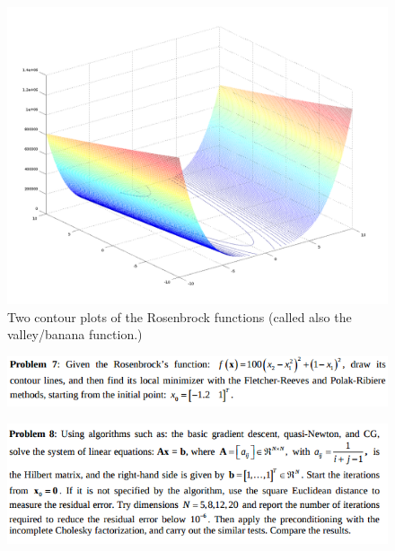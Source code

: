 \documentclass[eng,openany]{mgr}
\begin{document}
\begin{figure}[h]
\centering
\includegraphics[width=0.5\linewidth]{screenshot018}
\caption{Two contour plots of the Rosenbrock functions (called also the valley/banana function.)}
\label{fig:screenshot018}
\end{figure}


























\clearpage
\begin{figure}[h]
\centering
\includegraphics[width=0.7\linewidth]{screenshot016}
\label{fig:screenshot016}
\end{figure}










\clearpage
\begin{figure}[h]
\centering
\includegraphics[width=0.7\linewidth]{screenshot017}
\label{fig:screenshot017}
\end{figure}
\end{document}

